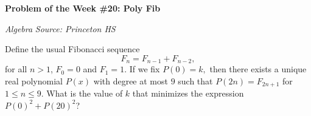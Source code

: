 \begin{potw}\vspace{5pt}
{\large\textbf{Problem of the Week \#20: Poly Fib}}\vspace{5pt}

\textit{Algebra}\newline
\textit{Source: Princeton HS}\V

Define the usual Fibonacci sequence \[F_n = F_{n-1}+F_{n-2},\] for all $n>1$, $F_0=0$ and $F_1=1$. If we fix $P(0)=k,$ then there exists a unique real polynomial \(P(x)\) with degree at most $9$ such that \(P(2n) = F_{2n+1}\) for \(1 \leq n \leq 9\). What is the value of $k$ that minimizes the expression \(P(0)^2 + P(20)^2\)? 
\end{potw}\V
